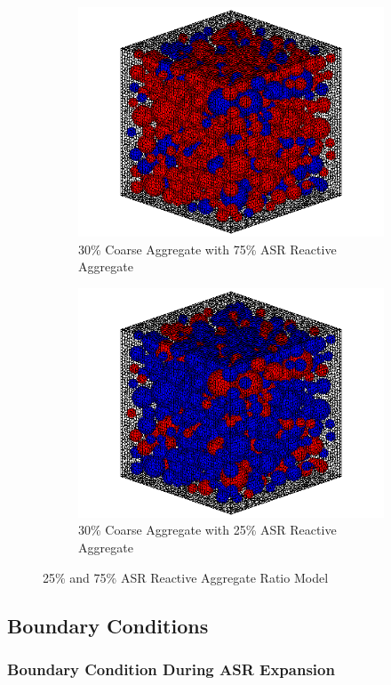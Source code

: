\begin{figure}[!h]
\centering
\begin{subfigure}{.5\textwidth}
  \centering
  \includegraphics[width=.8\linewidth]{Files/Aggregate/A30P75.png}%
  \caption{30\% Coarse Aggregate with 75\% ASR Reactive Aggregate}
\end{subfigure}%
\begin{subfigure}{.5\textwidth}
  \centering
  \includegraphics[width=.8\linewidth]{Files/Aggregate/A30P25.png} %
  \caption{30\% Coarse Aggregate with 25\% ASR Reactive Aggregate}
\end{subfigure}
\caption{25\% and 75\% ASR Reactive Aggregate Ratio Model}
\label{fig:Aggregate_Percentage}
\end{figure}

\subsection{Boundary Conditions}

\subsubsection{Boundary Condition During ASR Expansion}

